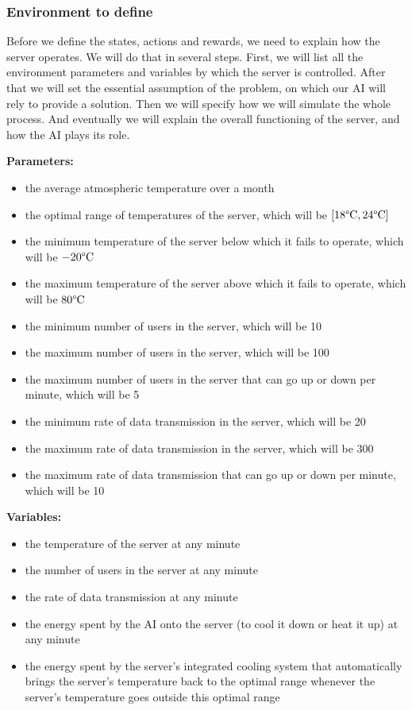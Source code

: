 \documentclass[]{book}
\begin{document}
\subsubsection{Environment to define}

Before we define the states, actions and rewards, we need to explain how the server operates. We will do that in several steps. First, we will list all the environment parameters and variables by which the server is controlled. After that we will set the essential assumption of the problem, on which our AI will rely to provide a solution. Then we will specify how we will simulate the whole process. And eventually we will explain the overall functioning of the server, and how the AI plays its role.

\textbf{Parameters:}

\begin{itemize}
    \item the average atmospheric temperature over a month
    \item the optimal range of temperatures of the server, which will be $[18 \degree \textrm{C}, 24 \degree \textrm{C}]$
    \item the minimum temperature of the server below which it fails to operate, which will be $-20 \degree \textrm{C}$
    \item the maximum temperature of the server above which it fails to operate, which will be $80 \degree \textrm{C}$
    \item the minimum number of users in the server, which will be 10
    \item the maximum number of users in the server, which will be 100
    \item the maximum number of users in the server that can go up or down per minute, which will be 5
    \item the minimum rate of data transmission in the server, which will be 20
    \item the maximum rate of data transmission in the server, which will be 300
    \item the maximum rate of data transmission that can go up or down per minute, which will be 10
\end{itemize}

\textbf{Variables:}

\begin{itemize}
    \item the temperature of the server at any minute
    \item the number of users in the server at any minute
    \item the rate of data transmission at any minute
    \item the energy spent by the AI onto the server (to cool it down or heat it up) at any minute
    \item the energy spent by the server's integrated cooling system that automatically brings the server's temperature back to the optimal range whenever the server's temperature goes outside this optimal range
\end{itemize}
\end{document}
